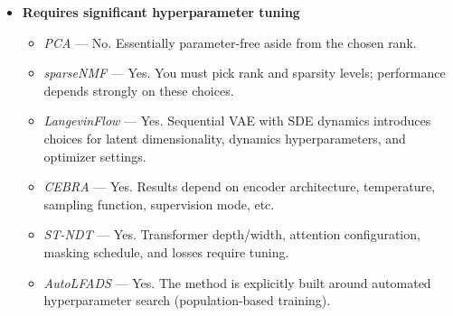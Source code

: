 \begin{itemize}
\item \textbf{Requires significant hyperparameter tuning}
    \begin{itemize}
    \item \textit{PCA} — No. Essentially parameter-free aside from the chosen rank.
    \item \textit{sparseNMF} — Yes. You must pick rank and sparsity levels; performance depends strongly on these choices.
    \item \textit{LangevinFlow} — Yes. Sequential VAE with SDE dynamics introduces choices for latent dimensionality, dynamics hyperparameters, and optimizer settings.
    \item \textit{CEBRA} — Yes. Results depend on encoder architecture, temperature, sampling function, supervision mode, etc.
    \item \textit{ST-NDT} — Yes. Transformer depth/width, attention configuration, masking schedule, and losses require tuning.
    \item \textit{AutoLFADS} — Yes. The method is explicitly built around automated hyperparameter search (population-based training).
    \end{itemize}
\end{itemize}
